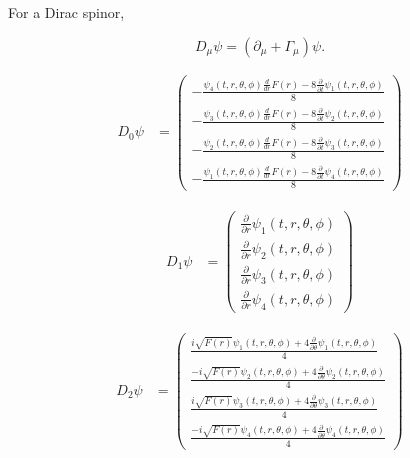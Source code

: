 \documentclass[12pt,fleqn]{article}
\begin{document}
For a Dirac spinor,

\[
D_\mu\psi
=
\left(
\partial_\mu+\Gamma_\mu
\right)\psi .
\]

\[
\begin{aligned}
D_{0}\psi &=
\begin{pmatrix}
- \frac{\psi_{4}{\left(t,r,\theta,\phi \right)} \frac{d}{d r} F{\left(r \right)} - 8 \frac{\partial}{\partial t} \psi_{1}{\left(t,r,\theta,\phi \right)}}{8} \\
- \frac{\psi_{3}{\left(t,r,\theta,\phi \right)} \frac{d}{d r} F{\left(r \right)} - 8 \frac{\partial}{\partial t} \psi_{2}{\left(t,r,\theta,\phi \right)}}{8} \\
- \frac{\psi_{2}{\left(t,r,\theta,\phi \right)} \frac{d}{d r} F{\left(r \right)} - 8 \frac{\partial}{\partial t} \psi_{3}{\left(t,r,\theta,\phi \right)}}{8} \\
- \frac{\psi_{1}{\left(t,r,\theta,\phi \right)} \frac{d}{d r} F{\left(r \right)} - 8 \frac{\partial}{\partial t} \psi_{4}{\left(t,r,\theta,\phi \right)}}{8}
\end{pmatrix}
\end{aligned}
\]

\[
\begin{aligned}
D_{1}\psi &=
\begin{pmatrix}
\frac{\partial}{\partial r} \psi_{1}{\left(t,r,\theta,\phi \right)} \\
\frac{\partial}{\partial r} \psi_{2}{\left(t,r,\theta,\phi \right)} \\
\frac{\partial}{\partial r} \psi_{3}{\left(t,r,\theta,\phi \right)} \\
\frac{\partial}{\partial r} \psi_{4}{\left(t,r,\theta,\phi \right)}
\end{pmatrix}
\end{aligned}
\]

\[
\begin{aligned}
D_{2}\psi &=
\begin{pmatrix}
\frac{i \sqrt{F{\left(r \right)}} \psi_{1}{\left(t,r,\theta,\phi \right)} + 4 \frac{\partial}{\partial \theta} \psi_{1}{\left(t,r,\theta,\phi \right)}}{4} \\
\frac{- i \sqrt{F{\left(r \right)}} \psi_{2}{\left(t,r,\theta,\phi \right)} + 4 \frac{\partial}{\partial \theta} \psi_{2}{\left(t,r,\theta,\phi \right)}}{4} \\
\frac{i \sqrt{F{\left(r \right)}} \psi_{3}{\left(t,r,\theta,\phi \right)} + 4 \frac{\partial}{\partial \theta} \psi_{3}{\left(t,r,\theta,\phi \right)}}{4} \\
\frac{- i \sqrt{F{\left(r \right)}} \psi_{4}{\left(t,r,\theta,\phi \right)} + 4 \frac{\partial}{\partial \theta} \psi_{4}{\left(t,r,\theta,\phi \right)}}{4}
\end{pmatrix}
\end{aligned}
\]
\end{document}
